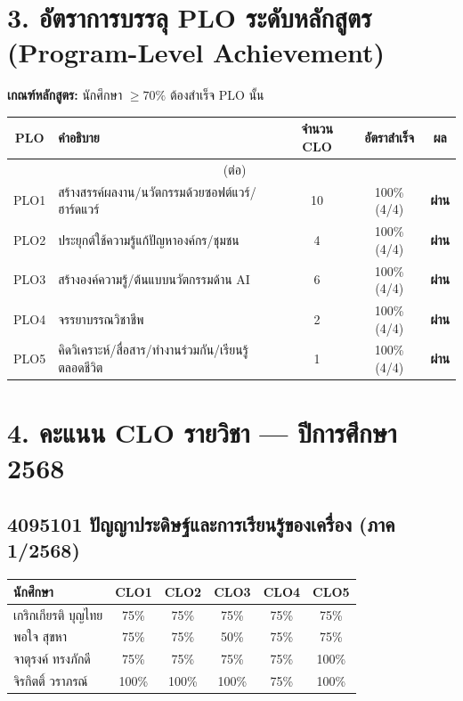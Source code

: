 \documentclass[12pt,a4paper]{article}
\begin{document}
\section*{3. อัตราการบรรลุ PLO ระดับหลักสูตร (Program-Level Achievement)}
\textbf{เกณฑ์หลักสูตร:} นักศึกษา $\geq 70\%$ ต้องสำเร็จ PLO นั้น\\[4pt]
\begin{longtable}{|c|p{7cm}|c|c|c|}
\hline
\rowcolor{hdr}\color{white}\textbf{PLO} & \color{white}\textbf{คำอธิบาย} & \color{white}\textbf{จำนวน CLO} & \color{white}\textbf{อัตราสำเร็จ} & \color{white}\textbf{ผล} \\ \hline
\endfirsthead \multicolumn{5}{c}{\tablename\ (ต่อ)} \\ \hline \endhead
  \cellcolor{pass}PLO1 & สร้างสรรค์ผลงาน/นวัตกรรมด้วยซอฟต์แวร์/ฮาร์ดแวร์ & 10 & 100\% (4/4) & \cellcolor{pass}\textbf{ผ่าน} \\ \hline
  \cellcolor{pass}PLO2 & ประยุกต์ใช้ความรู้แก้ปัญหาองค์กร/ชุมชน & 4 & 100\% (4/4) & \cellcolor{pass}\textbf{ผ่าน} \\ \hline
  \cellcolor{pass}PLO3 & สร้างองค์ความรู้/ต้นแบบนวัตกรรมด้าน AI & 6 & 100\% (4/4) & \cellcolor{pass}\textbf{ผ่าน} \\ \hline
  \cellcolor{pass}PLO4 & จรรยาบรรณวิชาชีพ & 2 & 100\% (4/4) & \cellcolor{pass}\textbf{ผ่าน} \\ \hline
  \cellcolor{pass}PLO5 & คิดวิเคราะห์/สื่อสาร/ทำงานร่วมกัน/เรียนรู้ตลอดชีวิต & 1 & 100\% (4/4) & \cellcolor{pass}\textbf{ผ่าน} \\ \hline
\end{longtable}
\section*{4. คะแนน CLO รายวิชา — ปีการศึกษา 2568}
\subsection*{4095101 ปัญญาประดิษฐ์และการเรียนรู้ของเครื่อง (ภาค 1/2568)}
\begin{longtable}{|p{4.5cm}|c|c|c|c|c|}
\hline
\rowcolor{hdr}\color{white}\textbf{นักศึกษา} & \color{white}\textbf{CLO1} & \color{white}\textbf{CLO2} & \color{white}\textbf{CLO3} & \color{white}\textbf{CLO4} & \color{white}\textbf{CLO5} \\ \hline
\endfirsthead \hline \endhead
  เกริกเกียรติ บุญไทย & \cellcolor{pass}75\% & \cellcolor{pass}75\% & \cellcolor{pass}75\% & \cellcolor{pass}75\% & \cellcolor{pass}75\% \\ \hline
  พอใจ สุขหา & \cellcolor{pass}75\% & \cellcolor{pass}75\% & \cellcolor{fail}50\% & \cellcolor{pass}75\% & \cellcolor{pass}75\% \\ \hline
  จาตุรงค์ ทรงภักดี & \cellcolor{pass}75\% & \cellcolor{pass}75\% & \cellcolor{pass}75\% & \cellcolor{pass}75\% & \cellcolor{pass}100\% \\ \hline
  จิรกิตติ์ วราภรณ์ & \cellcolor{pass}100\% & \cellcolor{pass}100\% & \cellcolor{pass}100\% & \cellcolor{pass}75\% & \cellcolor{pass}100\% \\ \hline
\end{longtable}
\end{document}
